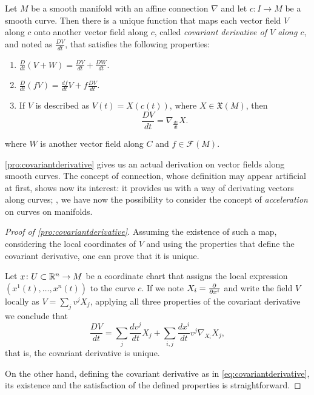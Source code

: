\begin{proposition}
	\label{pro:covariantderivative}
	Let $M$ be a smooth manifold with an affine connection $\nabla$ and let $c \colon I \to M$ be a smooth curve. Then there is a unique function that maps each vector field $V$ along $c$ onto another vector field along $c$, called \emph{covariant derivative of $V$ along $c$}, and noted as $\frac{DV}{dt}$, that satisfies the following properties:
	\begin{enumerate}
		\item $\frac{D}{dt}(V+W) = \frac{DV}{dt} + \frac{DW}{dt}$.
		\item $\frac{D}{dt}(fV) = \frac{df}{dt}V + f\frac{DV}{dt}$.
		\item If $V$ is described as $V(t) = X(c(t))$, where $X \in \mathfrak{X}(M)$, then \[\frac{DV}{dt} = \nabla_{\frac{dc}{dt}} X.\]
	\end{enumerate}
	where $W$ is another vector field along $C$ and $f \in \mathcal{F}(M)$.
\end{proposition}

\autoref{pro:covariantderivative} gives us an actual derivation on vector fields along smooth curves. The concept of connection, whose definition may appear artificial at first, shows now its interest: it provides us with a way of derivating vectors along curves; \ie, we have now the possibility to consider the concept of \emph{acceleration} on curves on manifolds.

\begin{proof}[Proof of \autoref{pro:covariantderivative}]
	Assuming the existence of such a map, considering the local coordinates of $V$ and using the properties that define the covariant derivative, one can prove that it is unique.
	
	Let $x \colon U \subset \mathbb{R}^n \to M$ be a coordinate chart that assigns the local expression $(x^1(t), \dots, x^n(t))$ to the curve $c$. If we note $X_i = \frac{\partial^{} }{\partial x^i}$ and write the field $V$ locally as $V = \sum_j v^j X_j$, applying all three properties of the covariant derivative we conclude that
	\begin{equation}
	\label{eq:covariantderivative}
		\frac{DV}{dt} = \sum_j \frac{d v^j}{dt} X_j + \sum_{i,j} \frac{d x^i}{dt} v^j \nabla_{X_i} X_j,
	\end{equation}
	that is, the covariant derivative is unique.
	
	On the other hand, defining the covariant derivative as in \autoref{eq:covariantderivative}, its existence and the satisfaction of the defined properties is straightforward.
\end{proof}

